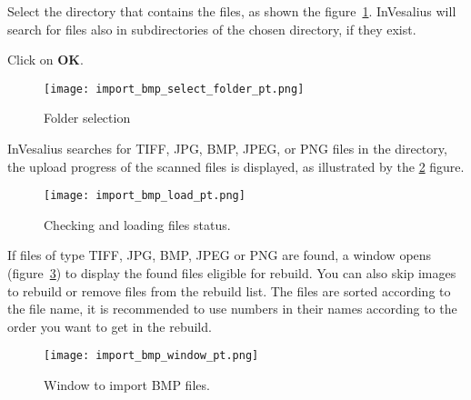 Select the directory that contains the files, as shown the figure~\ref{fig:import_bmp_select_folder}. InVesalius will search for files also in subdirectories of the chosen directory, if they exist. 


Click on \textbf{OK}.

\begin{figure}[!htb]
\centering
\texttt{[image: import\_bmp\_select\_folder\_pt.png]}
\caption{Folder selection}
\label{fig:import_bmp_select_folder}
\end{figure}


InVesalius searches for TIFF, JPG, BMP, JPEG, or PNG files in the directory, the upload progress of the scanned files is displayed, as illustrated by the \ref{fig:import_bmp_load_pt} figure.

\begin{figure}[!htb]
\centering
\texttt{[image: import\_bmp\_load\_pt.png]}
\caption{Checking and loading files status.}
\label{fig:import_bmp_load_pt}
\end{figure}


If files of type TIFF, JPG, BMP, JPEG or PNG are found, a window opens (figure~\ref{fig:import_bmp_window_pt}) to display the found files eligible for rebuild. You can also skip images to rebuild or remove files from the rebuild list. The files are sorted according to the file name, it is recommended to use numbers in their names according to the order you want to get in the rebuild.

\begin{figure}[!htb]
\centering
\texttt{[image: import\_bmp\_window\_pt.png]}
\caption{Window to import BMP files.}
\label{fig:import_bmp_window_pt}
\end{figure}

